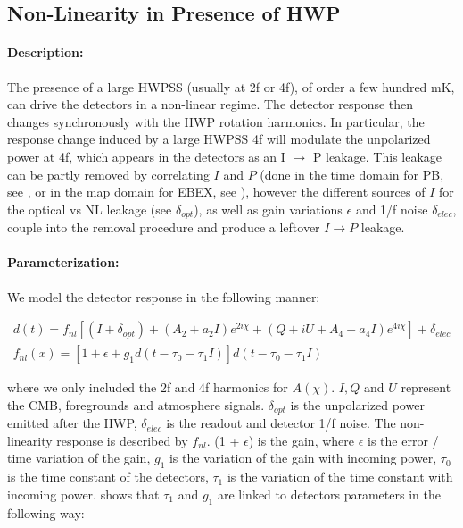 \subsection{Non-Linearity in Presence of HWP}

\paragraph{Description:} 

The presence of a large HWPSS (usually at 2f or 4f), of order a few hundred mK, can drive the detectors in a non-linear regime. The detector response then changes synchronously with the HWP rotation harmonics. In particular, the response change induced by a large HWPSS 4f will modulate the unpolarized power at 4f, which appears in the detectors as an I $\rightarrow$ P leakage. This leakage can be partly removed by correlating $I$ and $P$ (done in the time domain for PB, see \cite{PB1_WHWP}, or in the map domain for EBEX, see \cite{joy_thesis_2016}), however the different sources of $I$ for the optical vs NL leakage (see $\delta_{opt}$), as well as gain variations $\epsilon$ and 1/f noise $\delta_{elec}$, couple into the removal procedure and produce a leftover $I \rightarrow P$ leakage.

\paragraph{Parameterization:}
We model the detector response in the following manner:

\begin{align}
d(t) = f_{nl} \left[  (I+\delta_{opt}) + (A_2 + a_2 I) e^{2 i \chi} + (Q + iU + A_4 + a_4 I)  e^{4 i \chi} \right] + \delta_{elec} \\
f_{nl}(x) = \left[ 1 + \epsilon + g_1 d(t - \tau_0 - \tau_1 I) \right] d(t - \tau_0 - \tau_1 I)
\end{align}

\noindent where we only included the 2f and 4f harmonics for $A(\chi)$. $I, Q$ and $U$ represent the CMB, foregrounds and atmosphere signals. $\delta_{opt}$ is the unpolarized power emitted after the HWP, $\delta_{elec}$ is the readout and detector 1/f noise. The non-linearity response is described by $f_{nl}$. (1 + $\epsilon$) is the gain, where $\epsilon$ is the error / time variation of the gain, $g_1$ is the variation of the gain with incoming power, $\tau_0$ is the time constant of the detectors, $\tau_1$ is the variation of the time constant with incoming power. \cite{PB1_WHWP} shows that $\tau_1$ and $g_1$ are linked to detectors parameters in the following way:

